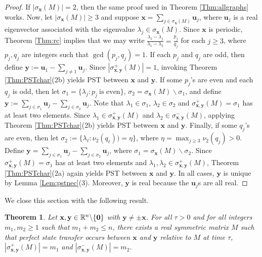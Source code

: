 \documentclass[11pt]{article}
\newtheorem{theorem}{Theorem}
\newcommand{\zero}{{\bf{0}}}
\newcommand{\bx}{\mathbf x}
\newcommand{\by}{\mathbf y}
\newcommand{\bu}{\mathbf u}
\def\R{\mathbb{R}}
\begin{document}
\begin{proof}
If $|\sigma_{\bx}(M)|=2$, then the same proof used in Theorem \ref{Thm:allgraphs} works. Now, let $|\sigma_{\bx}(M)|\geq 3$ and suppose $\bx=\sum_{j\in\sigma_{\bx}(M)}\bu_j$, where $\bu_j$ is a real eigenvector associated with the eigenvalue $\lambda_j\in\sigma_{\bx}(M)$. Since $\bx$ is periodic, Theorem \ref{Thm:rc} implies that we may write $\frac{\lambda_1-\lambda_j}{\lambda_1-\lambda_2}=\frac{p_j}{q_j}$ for each $j\geq 3$, where $p_j,q_j$ are integers such that $\operatorname{gcd}(p_j,q_j)=1$. If each $p_j$ and $q_j$ are odd, then define $\by:=\bu_1-\sum_{j\neq 1}\bu_j$. Since $|\sigma_{\bx,\by}^+(M)|=1$, invoking Theorem \ref{Thm:PSTchar}(2b) yields PST between $\bx$ and $\by$. If some $p_j$'s are even and each $q_j$ is odd, then let $\sigma_1=\{\lambda_j:p_j\ \text{is even}\}$, $\sigma_2=\sigma_{\bx}(M)\backslash\sigma_1$, and define $\by:=\sum_{j\in\sigma_1}\bu_j-\sum_{j\in\sigma_2}\bu_j$. Note that $\lambda_1\in\sigma_1$, $\lambda_2\in\sigma_2$ and $\sigma_{\bx,\by}^+(M)=\sigma_1$ has at least two elements. Since $\lambda_1\in \sigma_{\bx,\by}^+(M)$ and $\lambda_2\in \sigma_{\bx,\by}^-(M)$, applying Theorem \ref{Thm:PSTchar}(2b) yields PST between $\bx$ and $\by$. Finally, if some $q_j$'s are even, then let $\sigma_2:=\{\lambda_{\ell}:\nu_2(q_{\ell}))=\eta\}$, where $\eta=\max_{j\geq 3} \nu_2(q_j)>0$. Define $\by=\sum_{j\in\sigma_1}\bu_j-\sum_{j\in\sigma_2}\bu_j$, where $\sigma_1=\sigma_{\bx}(M)\backslash \sigma_2$. Since $\sigma_{\bx,\by}^+(M)=\sigma_1$ has at least two elements and $\lambda_1,\lambda_2\in \sigma_{\bx,\by}^+(M)$, Theorem \ref{Thm:PSTchar}(2a) again yields PST between $\bx$ and $\by$. In all cases, $\by$ is unique by Lemma \ref{Lem:pstnec}(3). Moreover, $\by$ is real because the $\bu_j$s are all real.
\end{proof}


We close this section with the following result.

\begin{theorem}
\label{Thm:prescribedPST}
Let $\bx,\by\in\R^n\backslash\{\zero\}$ with $\by\neq\pm \bx$. For all $\tau>0$ and for all integers $m_1,m_2\geq 1$ such that $m_1+m_2\leq n$, there exists a real symmetric matrix $M$ such that perfect state transfer occurs between $\bx$ and $\by$ relative to $M$ at time $\tau$, $|\sigma_{\bx,\by}^+(M)|=m_1$ and $|\sigma_{\bx,\by}^-(M)|=m_2$.
\end{theorem}
\end{document}
